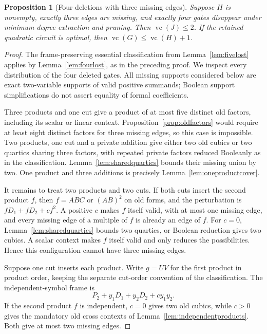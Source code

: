 \documentclass[11pt]{article}
\newcommand{\vc}{\operatorname{vc}}
\newtheorem{proposition}[theorem]{Proposition}
\theoremstyle{definition}
\theoremstyle{remark}
\begin{document}
\begin{proposition}[Four deletions with three missing edges]\label{prop:threefour}
Suppose $H$ is nonempty, exactly three edges are missing, and exactly four gates disappear under minimum-degree extraction and pruning. Then $\vc(J)\le2$. If the retained quadratic circuit is optimal, then $\vc(G)\le\vc(H)+1$.
\end{proposition}
\begin{proof}
The frame-preserving essential classification from Lemma~\ref{lem:fivelost} applies by Lemma~\ref{lem:fourlost}, as in the preceding proof. We inspect every distribution of the four deleted gates. All missing supports considered below are exact two-variable supports of valid positive summands; Boolean support simplifications do not assert equality of formal coefficients.

Three products and one cut give a product of at most five distinct old factors, including its scalar or linear context. Proposition~\ref{prop:oldfactors} would require at least eight distinct factors for three missing edges, so this case is impossible. Two products, one cut and a private addition give either two old cubics or two quartics sharing three factors, with repeated private factors reduced Booleanly as in the classification. Lemma~\ref{lem:sharedquartics} bounds their missing union by two. One product and three additions is precisely Lemma~\ref{lem:oneproductcover}.

It remains to treat two products and two cuts. If both cuts insert the second product $f$, then $f=ABC$ or $(AB)^2$ on old forms, and the perturbation is $fD_1+fD_2+c f^2$. A positive $c$ makes $f$ itself valid, with at most one missing edge, and every missing edge of a multiple of $f$ is already an edge of $f$. For $c=0$, Lemma~\ref{lem:sharedquartics} bounds two quartics, or Boolean reduction gives two cubics. A scalar context makes $f$ itself valid and only reduces the possibilities. Hence this configuration cannot have three missing edges.

Suppose one cut inserts each product. Write $g=UV$ for the first product in product order, keeping the separate cut-order convention of the classification. The independent-symbol frame is
\[
 P_2+y_1D_1+y_2D_2+c y_1y_2.
\]
If the second product $f$ is independent, $c=0$ gives two old cubics, while $c>0$ gives the mandatory old cross contexts of Lemma~\ref{lem:independentproducts}. Both give at most two missing edges.


\end{proof}
\end{document}
